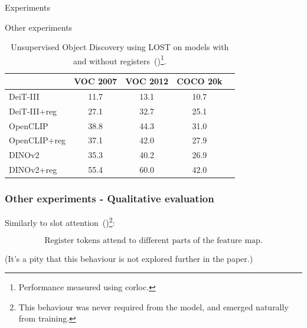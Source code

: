 \documentclass[aspectratio=169]{beamer}
\begin{document}
\begin{section}{Experiments}
\begin{subsection}{Other experiments}
\begin{frame}
\begin{table}[t]
    \centering
    \begin{tabular}{@{}l c ccc@{}}
        \toprule
                    & VOC 2007 & VOC 2012  & COCO 20k \\
        \midrule
      DeiT-III      & 11.7 & 13.1 & 10.7 \\
      DeiT-III+reg  & 27.1 & 32.7 & 25.1 \\
      \midrule
      OpenCLIP      & 38.8 & 44.3 & 31.0 \\
      OpenCLIP+reg  & 37.1 & 42.0 & 27.9 \\
      \midrule
      DINOv2        & 35.3 & 40.2 & 26.9 \\
      DINOv2+reg    & 55.4 & 60.0 & 42.0 \\
        \bottomrule
    \end{tabular}
    \caption{
      Unsupervised Object Discovery using LOST on models with and without registers~(\cite{darcetVisionTransformersNeed2024})\footnote{Performance measured using corloc.}.
    }  
    \label{tab:lost}
\end{table}
\end{frame}

\begin{frame}
\frametitle{Other experiments - Qualitative evaluation}

Similarly to slot attention~(\cite{locatelloObjectCentricLearningSlot2020})\footnote{This behaviour was never required from the model, and emerged naturally from training.}:

$$
\boxed{\text{Register tokens attend to different parts of the feature map.}}
$$

{\footnotesize
(It's a pity that this behaviour is not explored further in the paper.)
}


\end{frame}
\end{subsection}
\end{section}
\end{document}
